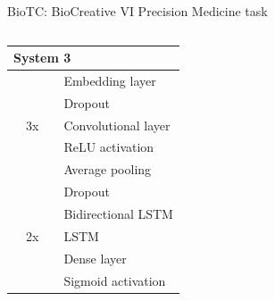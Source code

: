 \begin{frame}[t]{BioTC: BioCreative VI Precision Medicine task}
\begin{columns}[t,totalwidth=\textwidth]
\begin{column}{0.30\textwidth}
\begin{tabular}{l@{\hskip0pt}l@{\hskip0pt}l@{\hskip0pt}l}
\multicolumn{4}{l}{\minorscriptsize\textbf{System 3}}\\
\midrule
&                         & \hphantom{0} & Embedding layer\\
&                         &              & Dropout\\
& \multicolumn{1}{l|}{3x} &              & Convolutional layer\\
& \multicolumn{1}{l|}{}   &              & ReLU activation\\
& \multicolumn{1}{l|}{}   &              & Average pooling\\
& \multicolumn{1}{l|}{}   &              & Dropout\\
&                         &              & Bidirectional LSTM\\%
& \multicolumn{1}{l|}{2x} &              & LSTM\\%
&                         &              & Dense layer\\
&                         &              & Sigmoid activation\\%
\end{tabular}
\end{column}

\end{columns}

\end{frame}

